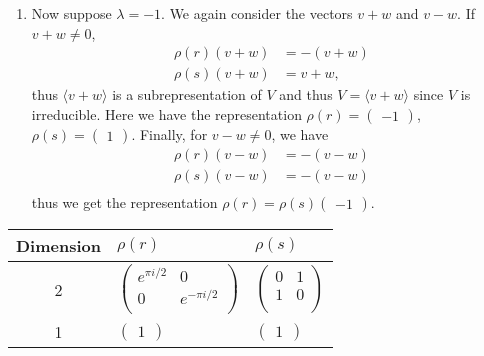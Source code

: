 \begin{questions}
\begin{solution}
\begin{enumerate}
\begin{enumerate}
              \item Now suppose $\lambda = -1$. We again consider the vectors $v+w$ and $v-w$. If $v + w \neq 0$,
                    \begin{align*}
                      \rho(r)(v+w) & = -(v+w) \\
                      \rho(s)(v+w) & = v+w,
                    \end{align*}
                    thus $\langle v+w \rangle$ is a subrepresentation of $V$ and thus $V = \langle v+w \rangle$ since $V$ is irreducible. Here we have the representation $\rho(r) = \begin{pmatrix} -1 \end{pmatrix}$, $\rho(s) = \begin{pmatrix} 1 \end{pmatrix}$.
                    Finally, for $v - w \neq 0$, we have
                    \begin{align*}
                      \rho(r)(v-w) & = -(v-w) \\
                      \rho(s)(v-w) & = -(v-w) \\
                    \end{align*}
                    thus we get the representation $\rho(r) = \rho(s) \begin{pmatrix} -1 \end{pmatrix}$.
            \end{enumerate}
    \end{enumerate}
    \begin{center}
      \begin{tabular}{cll}
        \toprule
        Dimension & $\rho(r)$                          & $\rho(s)$                          \\
        \midrule
        2         &
        $\begin{pmatrix}
             e^{\pi i/2} & 0            \\
             0           & e^{-\pi i/2} \\
           \end{pmatrix}$
                  &
        $\begin{pmatrix}
             0 & 1 \\
             1 & 0 \\
           \end{pmatrix}$                                                                     \\
        1         & $\begin{pmatrix} 1 \end{pmatrix}$  & $\begin{pmatrix} 1 \end{pmatrix}$  \\

\end{tabular}
\end{center}
\end{solution}
\end{questions}
